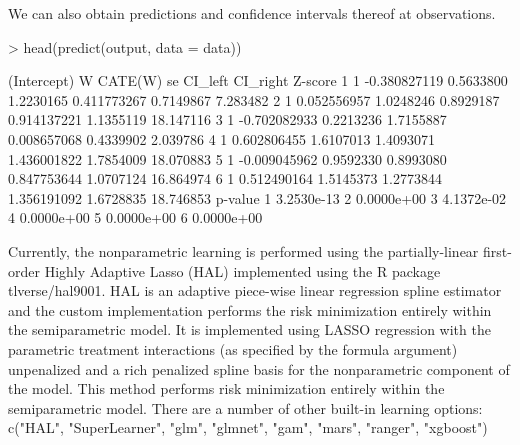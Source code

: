 \documentclass{article}
\begin{document}
We can also obtain predictions and confidence intervals thereof at observations.
\begin{Schunk}
\begin{Sinput}
> head(predict(output, data = data))
\end{Sinput}
\begin{Soutput}
  (Intercept)            W   CATE(W)        se     CI_left  CI_right   Z-score
1           1 -0.380827119 0.5633800 1.2230165 0.411773267 0.7149867  7.283482
2           1  0.052556957 1.0248246 0.8929187 0.914137221 1.1355119 18.147116
3           1 -0.702082933 0.2213236 1.7155887 0.008657068 0.4339902  2.039786
4           1  0.602806455 1.6107013 1.4093071 1.436001822 1.7854009 18.070883
5           1 -0.009045962 0.9592330 0.8993080 0.847753644 1.0707124 16.864974
6           1  0.512490164 1.5145373 1.2773844 1.356191092 1.6728835 18.746853
     p-value
1 3.2530e-13
2 0.0000e+00
3 4.1372e-02
4 0.0000e+00
5 0.0000e+00
6 0.0000e+00
\end{Soutput}
\end{Schunk}

Currently, the nonparametric learning is performed using the partially-linear first-order Highly Adaptive Lasso (HAL) implemented using the R package tlverse/hal9001. HAL is an adaptive piece-wise linear regression spline estimator and the custom implementation performs the risk minimization entirely within the semiparametric model. It is implemented using LASSO regression with the parametric treatment interactions (as specified by the formula argument) unpenalized and a rich penalized spline basis for the nonparametric component of the model. This method performs risk minimization entirely within the semiparametric model. There are a number of other built-in learning options: c("HAL", "SuperLearner", "glm", "glmnet", "gam", "mars", "ranger", "xgboost")
\end{document}
